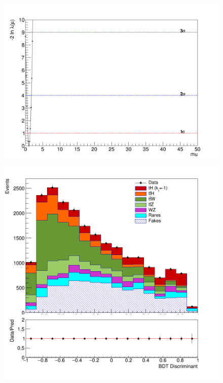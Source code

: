 \begin{linenumbers}
\begin{figure}[!htbp]
\begin{minipage}[b]{0.48\textwidth}
			\includegraphics[width=\textwidth]{Chapter4/kt-1/300fb/Likelihood.png}
		\end{minipage}
		\begin{minipage}[b]{0.48\textwidth}
			\includegraphics[width=\textwidth]{Chapter4/kt-1/3000fb/simple-3000-kt-1.png}
		\end{minipage}
		\hfill
		\begin{minipage}[b]{0.48\textwidth}

\end{minipage}
\end{figure}
\end{linenumbers}
